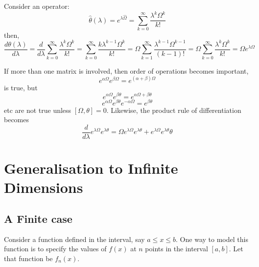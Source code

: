\documentclass[12pt,a4paper]{report}
\newcommand{\der}[2]{\frac{d#1}{d#2}}
\begin{document}
Consider an operator:
\begin{equation*}
    \hat{\theta}(\lambda) = e^{\lambda\hat{\Omega}} = \sum_{k=0}^\infty\frac{\lambda^k\Omega^k}{k!}
\end{equation*}
then,
\begin{equation*}
    \der{\theta(\lambda)}{\lambda} = \der{}{\lambda}\sum_{k=0}^\infty\frac{\lambda^k\Omega^k}{k!} = \sum_{k=0}^\infty\frac{k\lambda^{k-1}\Omega^k}{k!} = \Omega\sum_{k=1}^\infty\frac{\lambda^{k-1}\Omega^{k-1}}{(k-1)!} = \Omega\sum_{k=0}^\infty\frac{\lambda^{k}\Omega^k}{k!} = \Omega e^{\lambda\Omega}
\end{equation*}

If more than one matrix is involved, then order of operations becomes important,
\begin{equation*}
    e^{\alpha\Omega}e^{\beta\Omega} = e^{(\alpha + \beta)\Omega}
\end{equation*}
is true, but
\begin{equation*}
    e^{\alpha\Omega}e^{\beta\theta} = e^{\alpha\Omega + \beta\theta}
\end{equation*}
\begin{equation*}
    e^{\alpha\Omega}e^{\beta\theta}e^{-\alpha\Omega} = e^{\beta\theta}
\end{equation*}
etc are not true unless $[\Omega, \theta] = 0$. Likewise, the product rule of differentiation becomes
\begin{equation*}
    \der{}{\lambda} e^{\lambda\Omega}e^{\lambda\theta} = \Omega e^{\lambda\Omega}e^{\lambda\theta} + e^{\lambda\Omega}e^{\lambda\theta} \theta 
\end{equation*}

\section{Generalisation to Infinite Dimensions}

\subsection{A Finite case}
Consider a function defined in the interval, say $a \leq x \leq b$. One way to model this function is to specify the values of $f(x)$ at $n$ points in the interval $[a, b]$. Let that function be $f_n(x)$.
\end{document}
